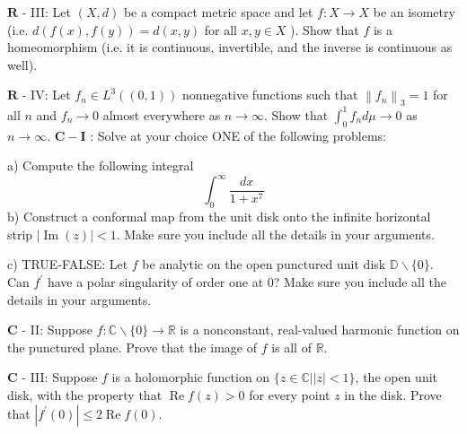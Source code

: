 \documentclass[14pt]{extarticle}
\begin{document}
$\mathbf{R}$ - III: Let $(X, d)$ be a compact metric space and let $f: X \rightarrow X$ be an isometry (i.e. $d(f(x), f(y))=d(x, y)$ for all $x, y \in X$ ). Show that $f$ is a homeomorphism (i.e. it is continuous, invertible, and the inverse is continuous as well).
\newpage

$\mathbf{R}$ - IV: Let $f_{n} \in L^{3}((0,1))$ nonnegative functions such that $\left\|f_{n}\right\|_{3}=1$ for all $n$ and $f_{n} \rightarrow 0$ almost everywhere as $n \rightarrow \infty$. Show that $\int_{0}^{1} f_{n} d \mu \rightarrow 0$ as $n \rightarrow \infty$.
\newpage
$\mathbf{C}-\mathbf{I}$ : Solve at your choice ONE of the following problems:

a) Compute the following integral
$$
\int_{0}^{\infty} \frac{d x}{1+x^{7}}
$$
b) Construct a conformal map from the unit disk onto the infinite horizontal strip $|\operatorname{Im}(z)|<1$. Make sure you include all the details in your arguments.

c) TRUE-FALSE: Let $f$ be analytic on the open punctured unit disk $\mathbb{D} \backslash\{0\}$. Can $f^{\prime}$ have a polar singularity of order one at 0? Make sure you include all the details in your arguments.
\newpage

$\mathbf{C}$ - II: Suppose $f: \mathbb{C} \backslash\{0\} \rightarrow \mathbb{R}$ is a nonconstant, real-valued harmonic function on the punctured plane. Prove that the image of $f$ is all of $\mathbb{R}$.
\newpage

$\mathbf{C}$ - III: Suppose $f$ is a holomorphic function on $\{z \in \mathbb{C}|| z \mid<1\}$, the open unit disk, with the property that $\operatorname{Re} f(z)>0$ for every point $z$ in the disk. Prove that $\left|f^{\prime}(0)\right| \leq 2 \operatorname{Re} f(0)$.
\newpage
\end{document}
